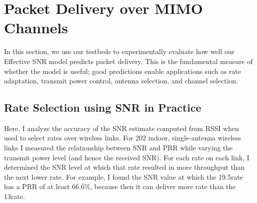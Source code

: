 \ifx\mainfile\undefined

\setcounter{chapter}{5} %
\fi

\cleardoublepage
\chapter{Packet Delivery over MIMO Channels}
\label{chap:delivery}

In this section, we use our testbeds to experimentally evaluate how well our Effective SNR model predicts packet delivery. This is the fundamental measure of whether the model is useful; good predictions enable applications such as rate adaptation, transmit power control, antenna selection, and channel selection.

\section{Rate Selection using SNR in Practice}
Here, I analyze the accuracy of the SNR estimate computed from RSSI when used to select rates over wireless links. For 202 indoor, single-antenna wireless links I measured the relationship between SNR and PRR while varying the transmit power level (and hence the received SNR). For each rate on each link, I determined the SNR level at which that rate resulted in more throughput than the next lower rate. For example, I found the SNR value at which the 19.5\Mbps rate has a PRR of at least $66.\overline{6}\%$, because then it can deliver more rate than the 13\Mbps rate.

